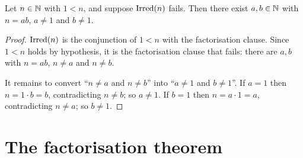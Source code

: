 \begin{lemma}
  \leanok
  \label{lem:exists_factor_of_not_irreducible}
  Let $n \in \mathbb{N}$ with $1 < n$, and suppose $\mathrm{Irred}(n)$ fails. Then there exist
  $a, b \in \mathbb{N}$ with $n = a b$, $a \neq 1$ and $b \neq 1$.
\end{lemma}
\begin{proof}

\leanok
  $\mathrm{Irred}(n)$ is the conjunction of $1 < n$ with the factorisation clause. Since
  $1 < n$ holds by hypothesis, it is the factorisation clause that fails: there
  are $a, b$ with $n = a b$, $n \neq a$ and $n \neq b$.

  It remains to convert ``$n \neq a$ and $n \neq b$'' into ``$a \neq 1$ and
  $b \neq 1$''. If $a = 1$ then $n = 1 \cdot b = b$, contradicting $n \neq b$;
  so $a \neq 1$. If $b = 1$ then $n = a \cdot 1 = a$, contradicting $n \neq a$;
  so $b \neq 1$.
\end{proof}

\section{The factorisation theorem}

